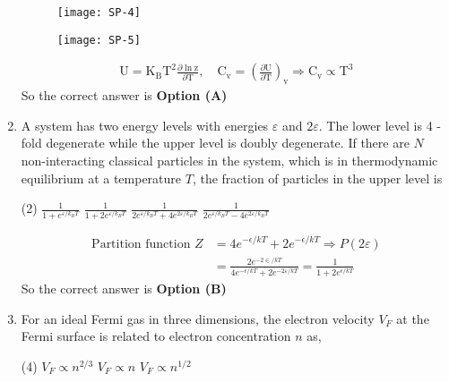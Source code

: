 \begin{enumerate}
\begin{tasks}
\task[\textbf{C.}] \begin{figure}[H]
	\centering
	\texttt{[image: SP-4]}
\end{figure}
\task[\textbf{D.}] \begin{figure}[H]
	\centering
	\texttt{[image: SP-5]}
\end{figure}
\end{tasks}
\begin{answer}
\begin{align*}
\mathrm{U}=\mathrm{K}_{\mathrm{B}} \mathrm{T}^{2} \frac{\partial \ln \mathrm{z}}{\partial \mathrm{T}}, \quad \mathrm{C}_{\mathrm{v}}=\left(\frac{\partial \mathrm{U}}{\partial \mathrm{T}}\right)_{\mathrm{v}} \Rightarrow \mathrm{C}_{\mathrm{v}} \propto \mathrm{T}^{3}
\end{align*}
So the correct answer is \textbf{Option (A)}
\end{answer}
\item 	A system has two energy levels with energies $\varepsilon$ and $2 \varepsilon .$ The lower level is 4 -fold degenerate while the upper level is doubly degenerate. If there are $N$ non-interacting classical particles in the system, which is in thermodynamic equilibrium at a temperature $T$, the fraction of particles in the upper level is
\begin{tasks}(2)
\task[\textbf{A.}] $\frac{1}{1+e^{\varepsilon / k_{B} T}}$
\task[\textbf{B.}] $\frac{1}{1+2 e^{\varepsilon / k_{B} T}}$
\task[\textbf{C.}] $\frac{1}{2 e^{\varepsilon / k_{B} T}+4 e^{2 \varepsilon / k_{B} T}}$
\task[\textbf{D.}] $\frac{1}{2 e^{\varepsilon / k_{B} T}-4 e^{2 \varepsilon / k_{B} T}}$
\end{tasks}
\begin{answer}
\begin{align*}
\text{Partition function }Z&=4 e^{-\epsilon / k T}+2 e^{-\epsilon / k T} \Rightarrow P(2 \varepsilon)\\&=\frac{2 e^{-2 \in / k T}}{4 e^{-\epsilon / k T}+2 e^{-2 \varepsilon / k T}}=\frac{1}{1+2 e^{\epsilon / k T}}
\end{align*}
So the correct answer is \textbf{Option (B)}
\end{answer}
\item 	For an ideal Fermi gas in three dimensions, the electron velocity $V_{F}$ at the Fermi surface is related to electron concentration $n$ as,
\begin{tasks}(4)
\task[\textbf{A.}] $V_{F} \propto n^{2 / 3}$
\task[\textbf{B.}]  $V_{F} \propto n$
\task[\textbf{C.}] $V_{F} \propto n^{1 / 2}$

\end{tasks}
\end{enumerate}
